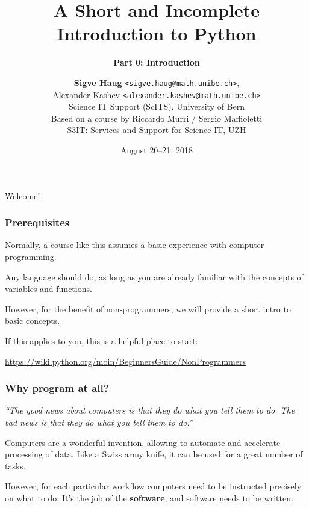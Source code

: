 \documentclass[english,serif,mathserif,xcolor=pdftex,dvipsnames,table]{beamer}
\title[Introduction to Python]{%
  A Short and Incomplete Introduction to Python
}
\subtitle{\bfseries Part 0: Introduction}
\author[S.~Haug]{%
  \textbf{Sigve Haug} \texttt{<sigve.haug@math.unibe.ch>}, \\
  Alexander Kashev \texttt{<alexander.kashev@math.unibe.ch>} \\
  Science IT Support (ScITS), University of Bern \\
  \medskip
  Based on a course by Riccardo Murri / Sergio Maffioletti
  \\
  S3IT: Services and Support for Science IT, UZH
}
\date{August 20--21, 2018}
\begin{document}
\maketitle

\begin{frame}
  \begin{center}
    {\Huge Welcome!}
  \end{center}
\end{frame}







\begin{frame}
  \frametitle{Prerequisites}
  Normally, a course like this assumes a basic experience with computer programming.

  \+
  Any language should do, as long as you are already familiar with
  the concepts of variables and functions.

  \+
  However, for the benefit of non-programmers, we will provide a short intro to basic concepts.

  \+
  If this applies to you, this is a helpful place to start:

  \url{https://wiki.python.org/moin/BeginnersGuide/NonProgrammers}
  
\end{frame}

\begin{frame}
  \frametitle{Why program at all?}

  \emph{``The good news about computers is that they do what you tell them to do.
  The bad news is that they do what you tell them to do.''}

  \+
  Computers are a wonderful invention, allowing to automate and accelerate
    processing of data. Like a Swiss army knife, it can be used for a great
    number of tasks.

  \+
  However, for each particular workflow computers need to be instructed
    precisely on what to do. It's the job of the \textbf{software},
    and software needs to be written.
\end{frame}
\end{document}
